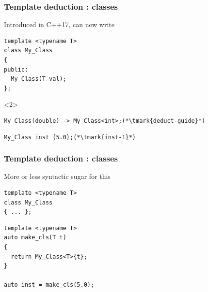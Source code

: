 \documentclass[14pt]{beamer}
\begin{document}
\begin{frame}[fragile]
  \frametitle{Template deduction : classes}

  Introduced in C++17, can now write

  \vspace{.25cm}

  \begin{overlayarea}{\textwidth}{5cm}
  \begin{lstlisting}[basicstyle=\codefontsize{12pt}]
template <typename T>
class My_Class
{
public:
  My_Class(T val);
};
  \end{lstlisting}
  \begin{onlyenv}<2>
  \begin{lstlisting}[basicstyle=\codefontsize{12pt},morekeywords={My_Class}]
My_Class(double) -> My_Class<int>;(*\tmark{deduct-guide}*)
  \end{lstlisting}
  \end{onlyenv}
  \end{overlayarea}

  \begin{lstlisting}[basicstyle=\codefontsize{12pt},morekeywords={My_Class}]
My_Class inst {5.0};(*\tmark{inst-1}*)
  \end{lstlisting}

  \nointerlineskip

\end{frame}

\begin{frame}[fragile]
  \frametitle{Template deduction : classes}

  More or less syntactic sugar for this

  \vspace{.25cm}

  \begin{lstlisting}[basicstyle=\codefontsize{12pt}]
template <typename T>
class My_Class
{ ... };
  \end{lstlisting}

  \begin{lstlisting}[basicstyle=\codefontsize{12pt}, morekeywords={My_Class}]
template <typename T>
auto make_cls(T t)
{
  return My_Class<T>{t};
}

auto inst = make_cls(5.0);
  \end{lstlisting}

\end{frame}
\end{document}
